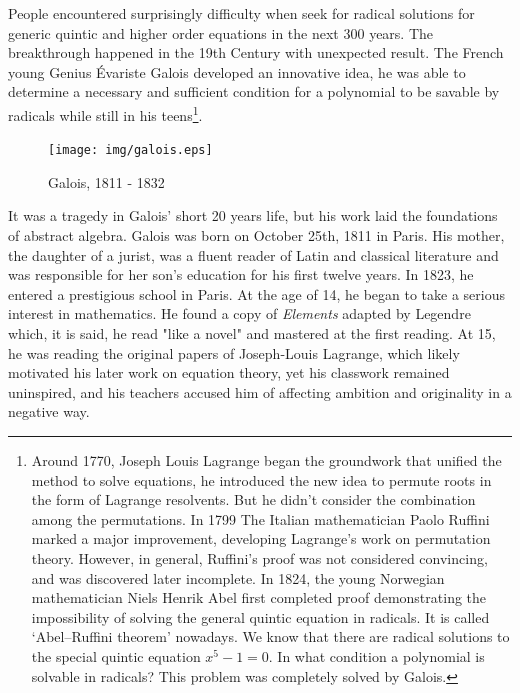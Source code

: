 \documentclass{article}
\begin{document}
People encountered surprisingly difficulty when seek for radical solutions for generic quintic and higher order equations in the next 300 years. The breakthrough happened in the 19th Century with unexpected result. The French young Genius Évariste Galois developed an innovative idea, he was able to determine a necessary and sufficient condition for a polynomial to be savable by radicals while still in his teens\footnote{Around 1770, Joseph Louis Lagrange began the groundwork that unified the method to solve equations, he introduced the new idea to permute roots in the form of Lagrange resolvents. But he didn't consider the combination among the permutations. In 1799 The Italian mathematician Paolo Ruffini marked a major improvement, developing Lagrange's work on permutation theory. However, in general, Ruffini's proof was not considered convincing, and was discovered later incomplete. In 1824, the young Norwegian mathematician Niels Henrik Abel first completed proof demonstrating the impossibility of solving the general quintic equation in radicals. It is called `Abel–Ruffini theorem' nowadays. We know that there are radical solutions to the special quintic equation $x^5-1=0$. In what condition a polynomial is solvable in radicals? This problem was completely solved by Galois\cite{Wiki-Galois-theory}.}.

\begin{figure}
 \centering
 \texttt{[image: img/galois.eps]}
 \captionsetup{labelformat=empty}
 \caption{Galois, 1811 - 1832}
 \label{fig:Galois}
\end{figure}

It was a tragedy in Galois' short 20 years life, but his work laid the foundations of abstract algebra. Galois was born on October 25th, 1811 in Paris. His mother, the daughter of a jurist, was a fluent reader of Latin and classical literature and was responsible for her son's education for his first twelve years. In 1823, he entered a prestigious school in Paris. At the age of 14, he began to take a serious interest in mathematics. He found a copy of {\em Elements} adapted by Legendre which, it is said, he read "like a novel" and mastered at the first reading. At 15, he was reading the original papers of Joseph-Louis Lagrange, which likely motivated his later work on equation theory, yet his classwork remained uninspired, and his teachers accused him of affecting ambition and originality in a negative way.
\end{document}
